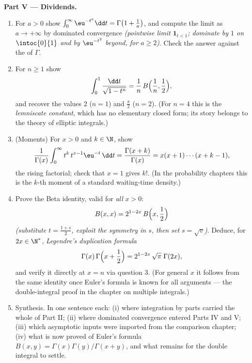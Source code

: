 \begin{problem}
\medskip
\noindent\textbf{Part V --- Dividends.}
\begin{enumerate}[resume]
  \item For $a > 0$ show $\int_0^\infty \eu^{-t^a}\dd t =
        \Gamma\bigl(1 + \frac1a\bigr)$, and compute the limit as
        $a \to +\infty$ by dominated convergence \emph{(pointwise
        limit $\mathbf 1_{t < 1}$; dominate by $1$ on
        $\intoc{0}{1}$ and by $\eu^{-t^2}$ beyond, for $a \geq
        2$)}. Check the answer against the  of
        $\Gamma$.
  \item For $n \geq 1$ show
        \[
        \int_0^1 \frac{\dd t}{\sqrt{1 - t^n}}
        = \frac1n\,B\Bigl(\frac1n, \frac12\Bigr),
        \]
        and recover the values $2$ ($n = 1$) and $\frac\pi2$ ($n
        = 2$). (For $n = 4$ this is the \emph{lemniscate
        constant}, which has no elementary closed form; its
        story belongs to the theory of elliptic integrals.)
  \item (Moments) For $x > 0$ and $k \in \N$, show
        \[
        \frac{1}{\Gamma(x)}\int_0^\infty
        t^{k}\,t^{x-1}\eu^{-t}\,\dd t
        = \frac{\Gamma(x+k)}{\Gamma(x)}
        = x(x+1)\cdots(x+k-1),
        \]
        the rising factorial; check that $x = 1$ gives $k!$. (In
        the probability chapters this is the $k$-th moment of a
        standard waiting-time density.)
  \item Prove the Beta identity, valid for \emph{all} $x > 0$:
        \[
        B(x, x) = 2^{1-2x}\,B\Bigl(x, \frac12\Bigr)
        \]
        \emph{(substitute $t = \frac{1+s}2$, exploit the
        symmetry in $s$, then set $s = \sqrt v$)}. Deduce, for
        $2x \in \N^*$, \emph{Legendre's duplication formula}
        \[
        \Gamma(x)\,\Gamma\Bigl(x + \frac12\Bigr)
        = 2^{1-2x}\,\sqrt\pi\;\Gamma(2x),
        \]
        and verify it directly at $x = n$ via question 3. (For
        general $x$ it follows from the same identity once
        Euler's formula is known for all arguments --- the
        double-integral proof in the chapter on multiple
        integrals.)
  \item Synthesis. In one sentence each: (i) where integration
        by parts carried the whole of Part II; (ii) where
        dominated convergence entered Parts IV and V; (iii) which
        asymptotic inputs were imported from the comparison
        chapter; (iv) what is now proved of Euler's formula
        $B(x,y) = \Gamma(x)\Gamma(y)/\Gamma(x+y)$, and what
        remains for the double integral to settle.
\end{enumerate}
\end{problem}
